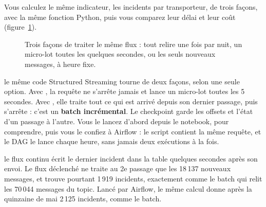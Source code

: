 Vous calculez le même indicateur, les incidents par transporteur, de trois façons, avec la même
fonction Python, puis vous comparez leur délai et leur coût (figure~\ref{c6:fig:modes}).

\begin{figure}[H]
\centering
{}
\caption{Trois façons de traiter le même flux : tout relire une fois par nuit, un micro-lot toutes
les quelques secondes, ou les seuls nouveaux messages, à heure fixe.}
\label{c6:fig:modes}
\end{figure}

\begin{notion}
le même code Structured Streaming tourne de deux
façons, selon une seule option. Avec , la requête ne
s'arrête jamais et lance un micro-lot toutes les 5 secondes. Avec ,
elle traite tout ce qui est arrivé depuis son dernier passage, puis s'arrête : c'est un
\textbf{batch incrémental}. Le checkpoint garde les offsets et l'état d'un passage à l'autre.
Vous le lancez d'abord depuis le notebook, pour comprendre, puis vous le confiez à Airflow : le
script  contient la même requête, et le DAG
 le lance chaque heure, sans jamais deux exécutions à la fois.
\end{notion}

\begin{resultat}
le flux continu écrit le dernier incident dans la table quelques secondes après son envoi. Le flux
déclenché ne traite au 2e passage que les 18\,137 nouveaux messages, et trouve pourtant 1\,919
incidents, exactement comme le batch qui relit les 70\,044 messages du topic. Lancé par Airflow,
le même calcul donne après la quinzaine de mai 2\,125 incidents, comme le batch.
\end{resultat}

